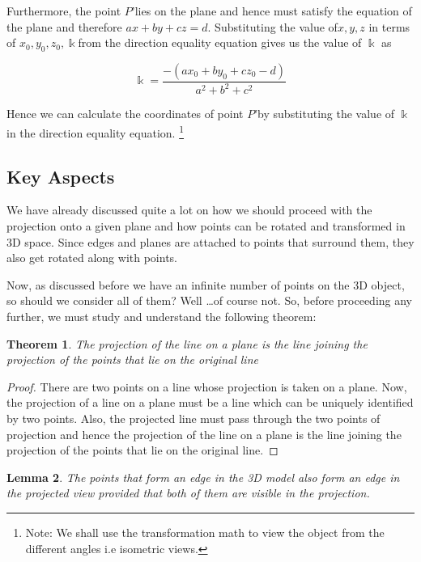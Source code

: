 \documentclass[12pt]{report}
\newtheorem{theorem}{Theorem}[section]
\newtheorem{lemma}[theorem]{Lemma}
\begin{document}
Furthermore, the point $P’ $lies on the plane and hence must satisfy the equation of the plane and therefore $ax + by + cz  = d$. Substituting the value of$ x,y,z$ in terms of $ x_{0},y_{0},z_{0}, \Bbbk $from the direction equality equation gives us the value of $\Bbbk$ as

\[ \Bbbk = \dfrac{ -(a x_{0} + b y_{0} + c z_{0} - d)}{ a^2 + b^2 + c^2 } \]

Hence we can calculate the coordinates of point $P’ $by substituting the value of $\Bbbk$ in the direction equality equation. \footnote{Note: We shall use the transformation math to view the object from the different angles i.e isometric views.}
\\

\subsection{Key Aspects}

We have already discussed quite a lot on how we should proceed with the projection onto a given plane and how points can be rotated and transformed in 3D space. Since edges and planes are attached to points that surround them, they also get rotated along with points.
\\
\vspace{0.3cm}

Now, as discussed before we have an infinite number of points on the 3D object, so should we consider all of them? Well \dots of course not. So, before proceeding any further, we must study and understand the following theorem:

\begin{theorem}
  The projection of the line on a plane is the line joining the projection of the points that lie on the original line
\end{theorem}
\begin{proof}
  There are two points on a line whose projection is taken on a plane. Now, the projection of a line on a plane must be a line which can be uniquely identified by two points. Also, the projected line must pass through the two points of projection and hence the projection of the line on a plane is the line joining the projection of the points that lie on the original line.
\end{proof}

\begin{lemma}
  \label{ingLemma}
  The points that form an edge in the 3D model also form an edge in the projected view provided that both of them are visible in the projection.
\end{lemma}
\end{document}
